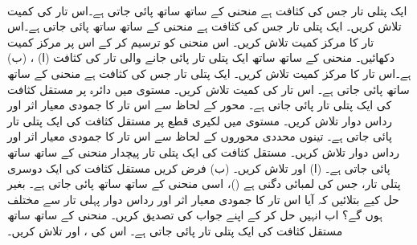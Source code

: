 \\
%
ایک پتلی تار جس کی کثافت  ہے منحنی  کے ساتھ ساتھ پائی جاتی ہے۔اس تار کی کمیت تلاش کریں۔
%
ایک پتلی  تار جس کی کثافت  ہے منحنی  کے ساتھ ساتھ پائی جاتی ہے۔اس تار کا مرکز کمیت تلاش کریں۔ اس منحنی کو ترسیم کر کے اس پر مرکز کمیت دکھائیں۔
%
منحنی  کے ساتھ ساتھ  ایک پتلی تار پائی جانے والی تار کی کثافت (ا) ، (ب)  ہے۔اس تار کا مرکز کمیت تلاش کریں۔
%
ایک پتلی تار جس کی کثافت  ہے منحنی
  کے ساتھ ساتھ پائی جاتی ہے۔ اس تار کی کمیت تلاش کریں۔
%
مستوی  میں دائرہ  پر مستقل کثافت  کی ایک پتلی تار پائی جاتی ہے۔ محور  کے لحاظ سے اس تار کا جمودی معیار اثر اور رداس  دوار تلاش کریں۔
%
مستوی  میں لکیری قطع  پر مستقل کثافت  کی ایک پتلی تار پائی جاتی ہے۔ تینوں محددی محوروں  کے لحاظ سے اس تار کا جمودی معیار اثر اور رداس  دوار تلاش کریں۔
%
مستقل کثافت  کی ایک پتلی تار پیچدار منحنی  کے ساتھ ساتھ پائی جاتی ہے۔ (ا)  اور  تلاش کریں۔ (ب) فرض کریں مستقل کثافت  کی ایک دوسری پتلی تار، جس کی لمبائی دگنی ہے ()، اسی منحنی  کے ساتھ ساتھ پائی جاتی ہے۔ بغیر حل کیے بتلائیں کہ آیا اس تار کا جمودی معیار اثر اور رداس دوار پہلی تار سے مختلف ہوں گے؟  اب انہیں حل کر کے اپنے جواب کی تصدیق کریں۔
%
منحنی  کے ساتھ ساتھ مستقل کثافت  کی ایک پتلی تار  پائی جاتی ہے۔ اس کی ،  اور  تلاش کریں۔
